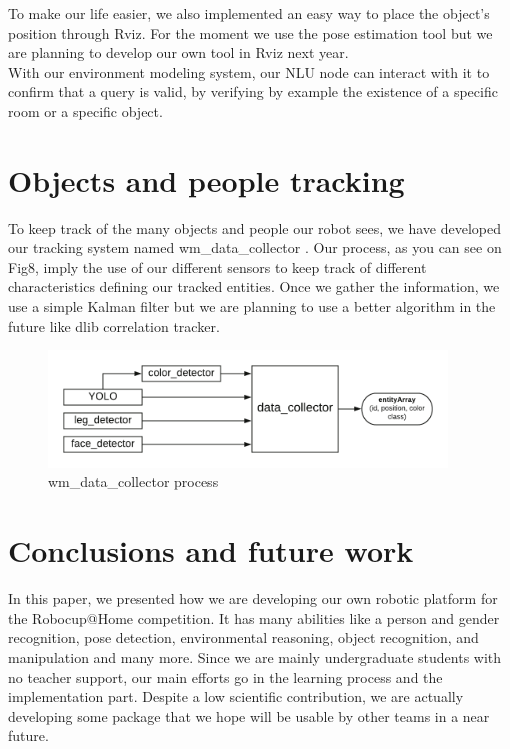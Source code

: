 \documentclass[runningheads,a4paper]{llncs}
\begin{document}
To make our life easier, we also implemented an easy way to place the object's position through Rviz. For the moment we use the pose estimation tool but we are planning to develop our own tool in Rviz next year.\\

With our environment modeling system, our NLU node can interact with it to confirm that a query is valid, by verifying by example the existence of a specific room or a specific object.  \\

\section{Objects and people tracking}

\tab To keep track of the many objects and people our robot sees, we have developed our tracking system named wm\_data\_collector \cite{wm_data_collector}. Our process, as you can see on Fig8, imply the use of our different sensors to keep track of different characteristics defining our tracked entities. Once we gather the information, we use a simple Kalman filter but we are planning to use a better algorithm in the future like dlib correlation tracker. \\

\begin{figure}
  \centering
  \includegraphics[width=300pt]{images/wm_data_collector.png}
  \caption{ wm\_data\_collector process}
\end{figure} 


\section{Conclusions and future work} 
\tab In this paper, we presented how we are developing our own robotic platform for the Robocup@Home competition. It has many abilities like a person and gender recognition, pose detection, environmental reasoning, object recognition, and manipulation and many more. Since we are mainly undergraduate students with no teacher support, our main efforts go in the learning process and the implementation part. Despite a low scientific contribution, we are actually developing some package that we hope will be usable by other teams in a near future.\\
\end{document}
